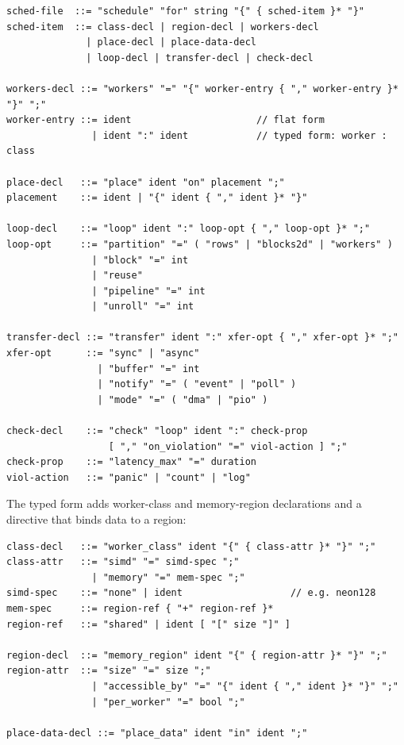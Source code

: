 \begin{verbatim}
sched-file  ::= "schedule" "for" string "{" { sched-item }* "}"
sched-item  ::= class-decl | region-decl | workers-decl
              | place-decl | place-data-decl
              | loop-decl | transfer-decl | check-decl

workers-decl ::= "workers" "=" "{" worker-entry { "," worker-entry }* "}" ";"
worker-entry ::= ident                      // flat form
               | ident ":" ident            // typed form: worker : class

place-decl   ::= "place" ident "on" placement ";"
placement    ::= ident | "{" ident { "," ident }* "}"

loop-decl    ::= "loop" ident ":" loop-opt { "," loop-opt }* ";"
loop-opt     ::= "partition" "=" ( "rows" | "blocks2d" | "workers" )
               | "block" "=" int
               | "reuse"
               | "pipeline" "=" int
               | "unroll" "=" int

transfer-decl ::= "transfer" ident ":" xfer-opt { "," xfer-opt }* ";"
xfer-opt      ::= "sync" | "async"
                | "buffer" "=" int
                | "notify" "=" ( "event" | "poll" )
                | "mode" "=" ( "dma" | "pio" )

check-decl    ::= "check" "loop" ident ":" check-prop
                  [ "," "on_violation" "=" viol-action ] ";"
check-prop    ::= "latency_max" "=" duration
viol-action   ::= "panic" | "count" | "log"
\end{verbatim}

The typed form adds worker-class and memory-region declarations and a directive
that binds data to a region:

\begin{verbatim}
class-decl   ::= "worker_class" ident "{" { class-attr }* "}" ";"
class-attr   ::= "simd" "=" simd-spec ";"
               | "memory" "=" mem-spec ";"
simd-spec    ::= "none" | ident                   // e.g. neon128
mem-spec     ::= region-ref { "+" region-ref }*
region-ref   ::= "shared" | ident [ "[" size "]" ]

region-decl  ::= "memory_region" ident "{" { region-attr }* "}" ";"
region-attr  ::= "size" "=" size ";"
               | "accessible_by" "=" "{" ident { "," ident }* "}" ";"
               | "per_worker" "=" bool ";"

place-data-decl ::= "place_data" ident "in" ident ";"
\end{verbatim}

